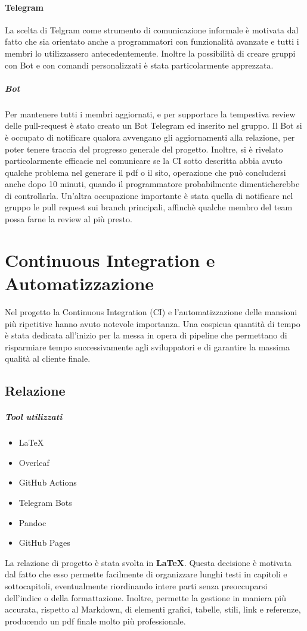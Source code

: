     \paragraph{Telegram}
    La scelta di Telgram come strumento di comunicazione informale è motivata dal fatto che sia orientato anche a programmatori con funzionalità avanzate e tutti i membri lo utilizzassero antecedentemente. Inoltre la possibilità di creare gruppi con Bot e con comandi personalizzati è stata particolarmente apprezzata.  
        \subparagraph{Bot} 
        Per mantenere tutti i membri aggiornati, e per supportare la tempestiva review delle pull-request è stato creato un Bot Telegram ed inserito nel gruppo. Il Bot si è occupato di notificare qualora avvengano gli aggiornamenti alla relazione, per poter tenere traccia del progresso generale del progetto. Inoltre, si è rivelato particolarmente efficacie nel comunicare se la CI sotto descritta abbia avuto qualche problema nel generare il pdf o il sito, operazione che può concludersi anche dopo 10 minuti, quando il programmatore probabilmente dimenticherebbe di controllarla.
        Un'altra occupazione importante è stata quella di notificare nel gruppo le pull request sui branch principali, affinchè qualche membro del team possa farne la review al più presto.

\section{Continuous Integration e Automatizzazione}
\label{chap:CI}
Nel progetto la Continuous Integration (CI) e l'automatizzazione delle mansioni più ripetitive hanno avuto notevole importanza. Una cospicua quantità di tempo è stata dedicata all'inizio per la messa in opera di pipeline che permettano di risparmiare tempo successivamente agli sviluppatori e di garantire la massima qualità al cliente finale.
    \subsection{Relazione}
        \subparagraph{Tool utilizzati}
        \begin{itemize}
            \item \LaTeX
            \item Overleaf
            \item GitHub Actions
            \item Telegram Bots
            \item Pandoc
            \item GitHub Pages
        \end{itemize}
        La relazione di progetto è stata svolta in \textbf{\LaTeX}. Questa decisione è motivata dal fatto che esso permette facilmente di organizzare lunghi testi in capitoli e sottocapitoli, eventualmente riordinando intere parti senza preoccuparsi dell'indice o della formattazione. Inoltre, permette la gestione in maniera più accurata, rispetto al Markdown, di elementi grafici, tabelle, stili, link e referenze, producendo un pdf finale molto più professionale. 
        
